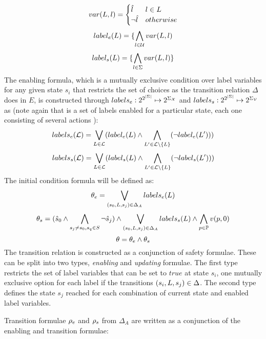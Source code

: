 \[
var(L, l) = \begin{cases}
\hat{l}_{} & l \in L \\
\neg \hat{l}_{} & otherwise
\end{cases}
\]
\[label_e(L) = \{\bigwedge_{l \in \mathcal{U}}var(L, l)\]
\[label_s(L) = \{\bigwedge_{l \in \Sigma}var(L, l)\}\]
The enabling formula, which is a mutually exclusive condition over label variables for any given state $s_i$ that restricts the set of choices as the transition relation $\Delta$ does in $E$, is constructed through $labels_e:2^{2^{|\Sigma|}}\mapsto 2^{\Sigma_{{\mathcal{X}}}}$ and $labels_s:2^{2^{|\Sigma|}}\mapsto 2^{\Sigma_{{\mathcal{V}}}}$ as (note again that  is a set of labels \actionLabel enabled for a particular state, each one consisting of several actions \action):
\[labels_e(\mathcal{L}) = \bigvee_{L \in \mathcal{L}}(label_e(L) \wedge \bigwedge_{L' \in \mathcal{L} \setminus \{L\}}(\neg label_e(L')) ) \]
\[labels_s(\mathcal{L}) = \bigvee_{L \in \mathcal{L}}(label_s(L) \wedge \bigwedge_{L' \in \mathcal{L} \setminus \{L\}}(\neg label_s(L')) ) \]
The initial condition formula will be defined as:
\[{\theta_e} = \bigvee_{(s_0,L,s_j) \in \Delta_A}labels_e(L)\]
\[{\theta_s} = (\hat{s}_{0} \wedge\bigwedge_{s_j \neq s_0, s_q \in S}\neg \hat{s}_{j})  \wedge \bigvee_{(s_0,L,s_j) \in \Delta_A}labels_s(L) \wedge \bigwedge_{p \in \mathbb{P}}v(p,0)\]
\[\theta = {\theta_e} \wedge {\theta_s}\]
The transition relation is constructed as a conjunction of safety formulae. These can be split into two types, \emph{enabling} and \emph{updating} formulae. The first type restricts the set of label variables that can be set to $true$ at state $s_i$, one mutually exclusive option for each label \actionLabel if the transitions $(s_i,L,s_j) \in \Delta$. The second type defines the state $s_j$ reached for each combination of current state and enabled label variables. 

Transition formulae ${\rho_e}$ and ${\rho_s}$ from $\Delta_A$ are written as a conjunction of the enabling and transition formulae:

